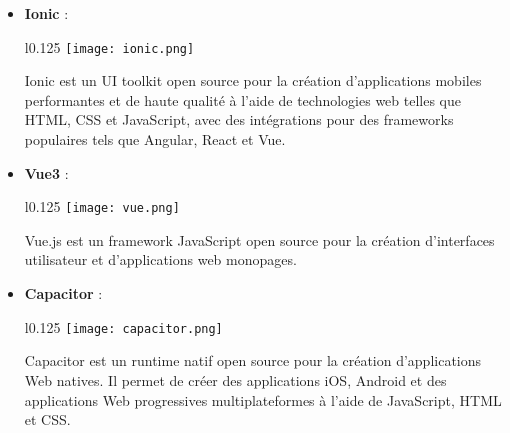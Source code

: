   \begin{itemize}
    \item \textbf{Ionic} :\\
    \begin{minipage}{\linewidth}
      \begin{wrapfigure}{l}{0.125\textwidth}
        \vspace{-0.5cm}
        \texttt{[image: ionic.png]} 
      \end{wrapfigure}
      Ionic est un UI toolkit open source pour la création d'applications mobiles performantes et de haute qualité à l'aide de technologies web telles que HTML, CSS et JavaScript, avec des intégrations pour des frameworks populaires tels que Angular, React et Vue. \cite{ionic}
    \end{minipage}
  
    \vspace{0.5cm}
  
    \item \textbf{Vue3} :\\
    \begin{minipage}{\linewidth}
      \begin{wrapfigure}{l}{0.125\textwidth}
        \vspace{-0.5cm}
        \texttt{[image: vue.png]} 
      \end{wrapfigure}
      Vue.js est un framework JavaScript open source pour la création d'interfaces utilisateur et d'applications web monopages. \cite{vuejs}
    \end{minipage}
  
    \vspace{0.5cm}
  
    \item \textbf{Capacitor} :\\
    \begin{minipage}{\linewidth}
      \begin{wrapfigure}{l}{0.125\textwidth}
        \vspace{-0.5cm}
        \texttt{[image: capacitor.png]} 
      \end{wrapfigure}
      Capacitor est un runtime natif open source pour la création d'applications Web natives. Il permet de créer des applications iOS, Android et des applications Web progressives multiplateformes à l'aide de JavaScript, HTML et CSS. \cite{capacitor}
    \end{minipage}
  
    \vspace{0.5cm}
  

\end{itemize}
